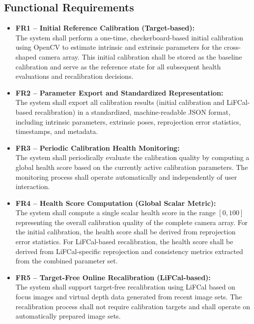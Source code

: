 \documentclass[12pt]{scrartcl}
\begin{document}
\subsection*{Functional Requirements}
\begin{itemize}

  
  \item \textbf{FR1 – Initial Reference Calibration (Target-based):} \\
  The system shall perform a one-time, checkerboard-based initial calibration using OpenCV
  to estimate intrinsic and extrinsic parameters for the cross-shaped camera array.
  This initial calibration shall be stored as the baseline calibration and serve as
  the reference state for all subsequent health evaluations and recalibration decisions.

  \item \textbf{FR2 – Parameter Export and Standardized Representation:} \\
  The system shall export all calibration results (initial calibration and LiFCal-based recalibration)
  in a standardized, machine-readable JSON format, including intrinsic parameters,
  extrinsic poses, reprojection error statistics, timestamps, and metadata.

  \item \textbf{FR3 – Periodic Calibration Health Monitoring:} \\
  The system shall periodically evaluate the calibration quality by computing
  a global health score based on the currently active calibration parameters.
  The monitoring process shall operate automatically and independently of user interaction.

  \item \textbf{FR4 – Health Score Computation (Global Scalar Metric):} \\
  The system shall compute a single scalar health score in the range $[0,100]$
  representing the overall calibration quality of the complete camera array.
  For the initial calibration, the health score shall be derived from
  reprojection error statistics.
  For LiFCal-based recalibration, the health score shall be derived from
  LiFCal-specific reprojection and consistency metrics extracted from the combined parameter set.

  \item \textbf{FR5 – Target-Free Online Recalibration (LiFCal-based):} \\
  The system shall support target-free recalibration using LiFCal
  based on focus images and virtual depth data generated from recent image sets.
  The recalibration process shall not require calibration targets
  and shall operate on automatically prepared image sets.


\end{itemize}
\end{document}
